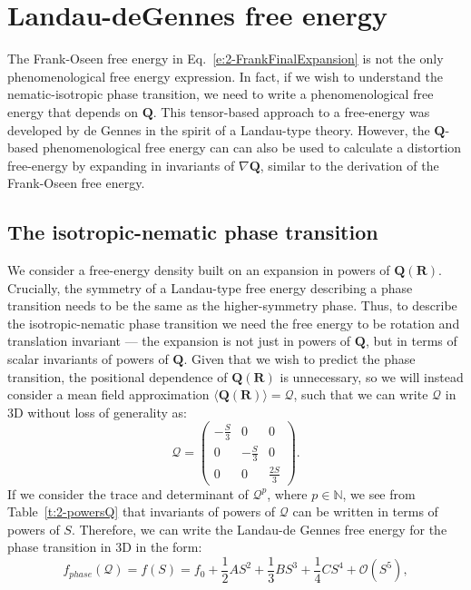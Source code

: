 \section{Landau-deGennes free energy}
The Frank-Oseen free energy in Eq.~\ref{e:2-FrankFinalExpansion} is not the only phenomenological free energy expression.
In fact, if we wish to understand the nematic-isotropic phase transition, we need to write a phenomenological free energy that depends on $\mathbf{Q}$.
This tensor-based approach to a free-energy was developed by de Gennes in the spirit of a Landau-type theory.
However, the $\mathbf{Q}$-based phenomenological free energy can can also be used to calculate a distortion free-energy by expanding in invariants of $\nabla \mathbf{Q}$, similar to the derivation of the Frank-Oseen free energy.


\subsection{The isotropic-nematic phase transition}
We consider a free-energy density built on an expansion in powers of $\mathbf{Q}(\mathbf{R})$.
Crucially, the symmetry of a Landau-type free energy describing a phase transition needs to be the same as the higher-symmetry phase.
Thus, to describe the isotropic-nematic phase transition we need the free energy to be rotation and translation invariant --- the expansion is not just in powers of $\mathbf{Q}$, but in terms of scalar invariants of powers of $\mathbf{Q}$.
Given that we wish to predict the phase transition, the positional dependence of $\mathbf{Q}(\mathbf{R})$ is unnecessary, so we will instead consider a mean field approximation $\langle \mathbf{Q}(\mathbf{R}) \rangle = \bm{\mathcal{Q}}$, such that we can write $\bm{\mathcal{Q}}$ in 3D without loss of generality as:
\begin{equation}
  \bm{\mathcal{Q}} =
    \begin{pmatrix}
        -\frac{S}{3} & 0 & 0 \\
        0 & -\frac{S}{3} & 0 \\
        0 & 0 & \frac{2S}{3}
    \end{pmatrix}.
\end{equation}
If we consider the trace and determinant of $\bm{\mathcal{Q}}^p$, where $p \in \mathbb{N}$, we see from Table~\ref{t:2-powersQ} that invariants of powers of $\bm{\mathcal{Q}}$ can be written in terms of powers of $S$.
Therefore, we can write the Landau-de Gennes free energy for the phase transition in 3D in the form:
\begin{equation}
  f_{phase}(\bm{\mathcal{Q}}) = f(S) = f_0 + \frac{1}{2}A S^2 + \frac{1}{3}B S^3 + \frac{1}{4}C S^4 + \mathcal{O} \left (S^5 \right ),\label{e:2-LdGTransGeneral}
\end{equation}
